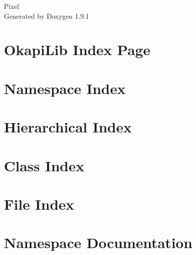 \let\mypdfximage\pdfximage\def\pdfximage{\immediate\mypdfximage}\documentclass[twoside]{book}
\newcommand{\+}{\discretionary{\mbox{\scriptsize$\hookleftarrow$}}{}{}}
\newcommand{\clearemptydoublepage}{%
  \newpage{\pagestyle{empty}\cleardoublepage}%
}
\begin{document}
\raggedbottom

\hypersetup{pageanchor=false,
             bookmarksnumbered=true,
             pdfencoding=unicode
            }
\begin{titlepage}
\vspace*{7cm}
\begin{center}%
{\Large Pixel }\\
\vspace*{1cm}
{\large Generated by Doxygen 1.9.1}\\
\end{center}
\end{titlepage}
\clearemptydoublepage
{}
\tableofcontents
\clearemptydoublepage
{}
\hypersetup{pageanchor=true}

\chapter{Okapi\+Lib Index Page}
\label{index}\hypertarget{index}{}
\chapter{Namespace Index}

\chapter{Hierarchical Index}

\chapter{Class Index}

\chapter{File Index}

\chapter{Namespace Documentation}












\end{document}
